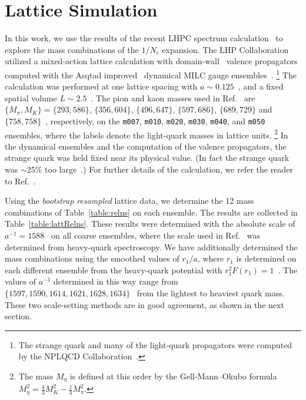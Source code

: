 \documentclass[twocolumn,nofootinbib,prd,aps,superscriptaddress,tightenlines]{revtex4}
\def\ufont#1{\text{#1}}
\begin{document}
\section{Lattice Simulation}
%
In this work, we use the results of the recent LHPC spectrum calculation~\cite{WalkerLoud:2008bp} to explore the mass combinations of the $1/N_c$ expansion.  The LHP Collaboration utilized a mixed-action lattice calculation with domain-wall~\cite{Kaplan:1992bt,Shamir:1993zy,Furman:1994ky} valence propagators computed with the Asqtad improved~\cite{Orginos:1998ue,Orginos:1999cr} dynamical MILC gauge ensembles~\cite{Bernard:2001av,Bazavov:2009bb}.%
\footnote{The strange quark and many of the light-quark propagators were computed by the NPLQCD Collaboration~\cite{Beane:2008dv}.} 
%
The calculation was performed at one lattice spacing with $a\sim 0.125$~\ufont{fm}, and a fixed spatial volume $L\sim 2.5$~\ufont{fm}.  The pion and kaon masses used in Ref.~\cite{WalkerLoud:2008bp} are $\{M_\pi,M_K\} = \{293,586\}$, $\{356,604\}$, $\{496,647\}$, $\{597,686\}$, $\{689,729\}$ and $\{758,758\}$~\ufont{MeV}, respectively, on the \texttt{m007}, \texttt{m010}, \texttt{m020}, \texttt{m030}, \texttt{m040}, and \texttt{m050} ensembles, where the labels denote the light-quark masses in lattice units.%
\footnote{The mass $M_\eta$ is defined at this order by the Gell-Mann--Okubo formula $M_\eta^2 = \frac 4 3 M_K^2 -\frac13 M_\pi^2$.}
In the dynamical ensembles and the computation of the valence propagators, the strange quark was held fixed near its physical value.  (In fact the strange quark was $\sim25\%$ too large~\cite{Aubin:2004ck}.)  For further details of the calculation, we refer the reader to Ref.~\cite{WalkerLoud:2008bp}.  

Using the \textit{bootstrap resampled} lattice data, we determine the 12 mass combinations of Table~\ref{table:relns} on each ensemble.  The results are collected in Table~\ref{table:lattRelns}.  These  results were determined with the absolute scale of $a^{-1}=1588$~\ufont{MeV} on all coarse ensembles, where the scale used in Ref.~\cite{WalkerLoud:2008bp}
was determined from heavy-quark spectroscopy.  We have additionally determined the mass combinations using the smoothed 
values of $r_1/a$, where $r_1$ is determined on each different ensemble from the heavy-quark potential with 
$r_1^2 F(r_1) = 1$~\cite{Aubin:2004wf}.  The values of $a^{-1}$ determined in this 
way range from $\{1597, 1590, 1614, 1621, 1628, 1634\}$~\ufont{MeV}  from the lightest to heaviest quark mass. 
These two scale-setting methods are in 
good agreement, as shown in the next section. 
  
\end{document}
